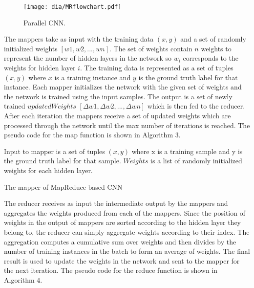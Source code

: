 \documentclass[12pt]{report}
\begin{document}
\begin{figure}[H]
\centering
\texttt{[image: dia/MRflowchart.pdf]}
\caption{Parallel CNN.}
\end{figure}

The mappers take as input with the training data $(x,y)$ and a set of randomly initialized weights $[w1, w2, ...,wn ]$. The set of weights contain $n$ weights to represent the number of hidden layers in the network so $w_i$ corresponds to the weights for hidden layer $i$. The training data is represented as a set of tuples $(x,y)$ where $x$ is a training instance and $y$ is the ground truth label for that instance. Each mapper initializes the network with the given set of weights and the network is trained using the input samples.  The output is a set of newly trained $updatedWeights$ $[\Delta w1, \Delta w2, ..., \Delta wn]$ which is then fed to the reducer.  After each iteration the mappers receive a set of updated weights which are processed through the network until the max number of iterations is reached. The pseudo code for the map function is shown in Algorithm 3.


\begin{algorithm}[H]
 Input to mapper is a set of tuples $(x,y)$ where
 x is a training sample and y is the ground truth label for that sample.  
 $Weights$ is a list of randomly initialized weights for each hidden layer.
 

\caption{The mapper of MapReduce based CNN}
\end{algorithm}

\hfill

The reducer receives as input the intermediate output by the mappers and aggregates the weights produced from each of the mappers. Since the position of weights in the output of mappers are sorted according to the hidden layer they belong to, the reducer can simply aggregate weights according to their index. The aggregation computes a cumulative sum over weights and then divides by the number of training instances in the batch to form an average of weights. The final result is used to update the weights in the network and sent to the mapper for the next iteration. The pseudo code for the reduce function is shown in Algorithm 4. 
\end{document}

